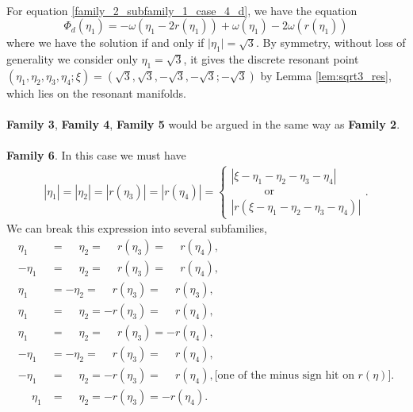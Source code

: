 \documentclass[reqno,english,11pt]{amsart}
\theoremstyle{definition}
\numberwithin{equation}{section}
\begin{document}
\\
\noindent
For equation \eqref{family_2_subfamily_1_case_4_d}, we have the equation
$$\Phi_d(\eta_1)=-\omega(\eta_1-2r(\eta_1))+\omega(\eta_1)-2\omega(r(\eta_1))$$
where we have the solution if and only if $\vert \eta_1\vert=\sqrt{3}$. By symmetry, without loss of generality we consider only $\eta_1=\sqrt{3}$, it gives the discrete resonant point $(\eta_1,\eta_2,\eta_3,\eta_4;\xi)=(\sqrt{3},\sqrt{3},-\sqrt{3},-\sqrt{3};-\sqrt{3})$  by Lemma \ref{lem:sqrt3_res}, which lies on the resonant manifolds.
\\\\
\noindent
\textbf{Family 3}, \textbf{Family 4}, \textbf{Family 5} would be argued in the same way as \textbf{Family 2}.
\\\\
\noindent
\textbf{Family 6}.  In this case we must have 
 \begin{align}
 |\eta_{1}|=|\eta_{2}|=|r(\eta_3)|=|r(\eta_4)| =\begin{cases} 
  |\xi-\eta_{1}-\eta_{2}-\eta_{3}-\eta_4| 
  \\
   \quad\quad\quad \text{or}
  \\
\left|r\left(\xi-\eta_{1}-\eta_{2}-\eta_{3}-\eta_4\right)\right|
 \end{cases}
 \label{eqn:fam_3_main_eqn}.
 \end{align}
 We can break this expression into several subfamilies,
  \begin{subequations}
 \label{eqn:fam_3_subfam}
 \begin{align}
 \eta_{1}&=\phantom{-}\eta_{2}=\phantom{-}r(\eta_{3})=\phantom{-}r\left(\eta_4\right),\label{eqn:fam_3_a}
 \\
 -\eta_{1} &=\phantom{-} \eta_{2} =\phantom{-}r(\eta_{3})= \phantom{-}r\left(\eta_4\right),\label{eqn:fam_3_b}
 \\
 \eta_{1} &= -\eta_{2} =\phantom{-}r(\eta_{3})=\phantom{-}r\left(\eta_3\right),\label{eqn:fam_3_c}
 \\
  \eta_{1} &= \phantom{-}\eta_{2} =-r(\eta_{3})=\phantom{-}r\left(\eta_4\right),\label{eqn:fam_3_d}
 \\
 \eta_{1} &= \phantom{-}\eta_{2} =\phantom{-}r(\eta_{3}) =- r\left(\eta_4\right),\label{eqn:fam_3_e}
  \\
 -\eta_{1} &= -\eta_{2} =\phantom{-}r(\eta_{3}) = \phantom{-}r\left(\eta_4\right),\label{eqn:fam_3_f}
   \\
 -\eta_{1} &= \phantom{-} \eta_{2} =-r(\eta_{3}) =\phantom{-}r\left(\eta_4\right),\text{[one of the minus sign hit on $r(\eta)$].}\label{eqn:fam_3_g} 
    \\
 \phantom{-}\eta_{1} &= \phantom{-} \eta_{2} =-r(\eta_{3}) =-r\left(\eta_4\right).\label{eqn:fam_3_h} 
 \end{align}
 \end{subequations}
  
\end{document}
